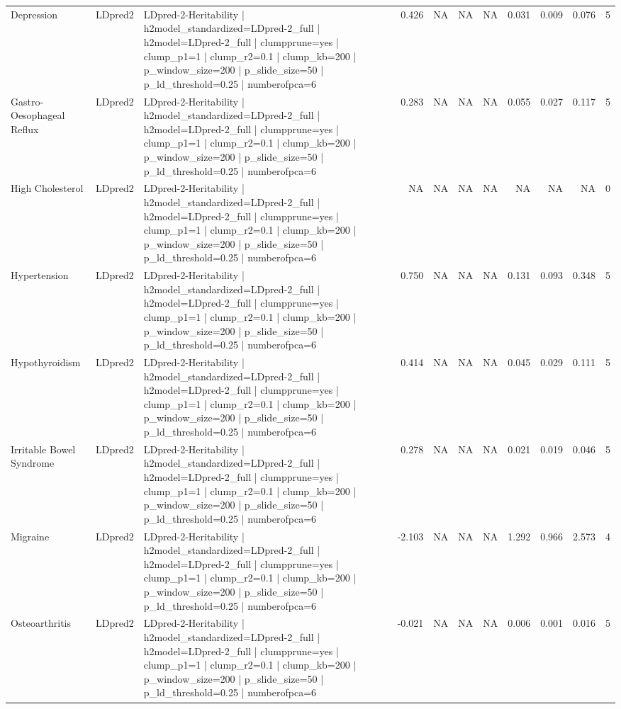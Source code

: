 \begin{landscape}
\begin{longtable}{p{2.4cm}p{1.8cm}p{6.0cm}rrrrrrrr}
Depression & LDpred2 & LDpred-2-Heritability | h2model\_standardized=LDpred-2\_full | h2model=LDpred-2\_full | clumpprune=yes | clump\_p1=1 | clump\_r2=0.1 | clump\_kb=200 | p\_window\_size=200 | p\_slide\_size=50 | p\_ld\_threshold=0.25 | numberofpca=6 & 0.426 & NA & NA & NA & 0.031 & 0.009 & 0.076 & 5 \\
Gastro-Oesophageal Reflux & LDpred2 & LDpred-2-Heritability | h2model\_standardized=LDpred-2\_full | h2model=LDpred-2\_full | clumpprune=yes | clump\_p1=1 | clump\_r2=0.1 | clump\_kb=200 | p\_window\_size=200 | p\_slide\_size=50 | p\_ld\_threshold=0.25 | numberofpca=6 & 0.283 & NA & NA & NA & 0.055 & 0.027 & 0.117 & 5 \\
High Cholesterol & LDpred2 & LDpred-2-Heritability | h2model\_standardized=LDpred-2\_full | h2model=LDpred-2\_full | clumpprune=yes | clump\_p1=1 | clump\_r2=0.1 | clump\_kb=200 | p\_window\_size=200 | p\_slide\_size=50 | p\_ld\_threshold=0.25 | numberofpca=6 & NA & NA & NA & NA & NA & NA & NA & 0 \\
Hypertension & LDpred2 & LDpred-2-Heritability | h2model\_standardized=LDpred-2\_full | h2model=LDpred-2\_full | clumpprune=yes | clump\_p1=1 | clump\_r2=0.1 | clump\_kb=200 | p\_window\_size=200 | p\_slide\_size=50 | p\_ld\_threshold=0.25 | numberofpca=6 & 0.750 & NA & NA & NA & 0.131 & 0.093 & 0.348 & 5 \\
Hypothyroidism & LDpred2 & LDpred-2-Heritability | h2model\_standardized=LDpred-2\_full | h2model=LDpred-2\_full | clumpprune=yes | clump\_p1=1 | clump\_r2=0.1 | clump\_kb=200 | p\_window\_size=200 | p\_slide\_size=50 | p\_ld\_threshold=0.25 | numberofpca=6 & 0.414 & NA & NA & NA & 0.045 & 0.029 & 0.111 & 5 \\
Irritable Bowel Syndrome & LDpred2 & LDpred-2-Heritability | h2model\_standardized=LDpred-2\_full | h2model=LDpred-2\_full | clumpprune=yes | clump\_p1=1 | clump\_r2=0.1 | clump\_kb=200 | p\_window\_size=200 | p\_slide\_size=50 | p\_ld\_threshold=0.25 | numberofpca=6 & 0.278 & NA & NA & NA & 0.021 & 0.019 & 0.046 & 5 \\
Migraine & LDpred2 & LDpred-2-Heritability | h2model\_standardized=LDpred-2\_full | h2model=LDpred-2\_full | clumpprune=yes | clump\_p1=1 | clump\_r2=0.1 | clump\_kb=200 | p\_window\_size=200 | p\_slide\_size=50 | p\_ld\_threshold=0.25 | numberofpca=6 & -2.103 & NA & NA & NA & 1.292 & 0.966 & 2.573 & 4 \\
Osteoarthritis & LDpred2 & LDpred-2-Heritability | h2model\_standardized=LDpred-2\_full | h2model=LDpred-2\_full | clumpprune=yes | clump\_p1=1 | clump\_r2=0.1 | clump\_kb=200 | p\_window\_size=200 | p\_slide\_size=50 | p\_ld\_threshold=0.25 | numberofpca=6 & -0.021 & NA & NA & NA & 0.006 & 0.001 & 0.016 & 5 \\

\end{longtable}
\end{landscape}
